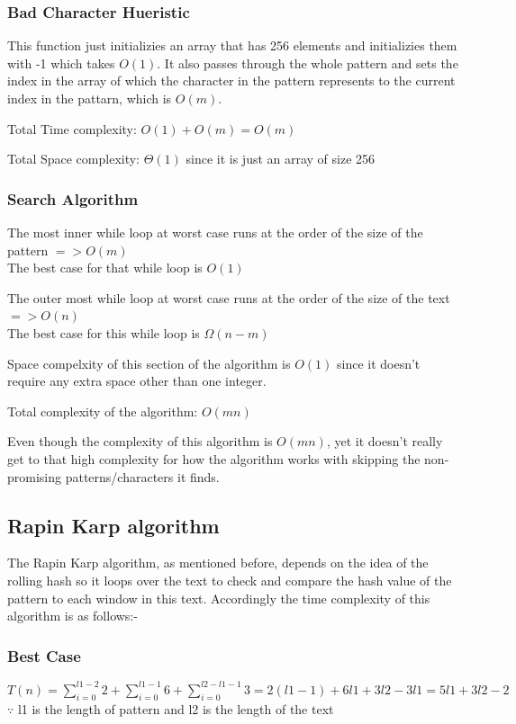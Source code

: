 \documentclass{article}
\theoremstyle{plain}
\begin{document}
\subsubsection*{Bad Character Hueristic}

This function just initializies an array that has 256 elements and initializies them with -1 which takes $O(1)$.
It also passes through the whole pattern and sets the index in the array of which the character in the pattern represents to the current index in the pattarn, which is $O(m)$.

\noindent Total Time complexity: $O(1) + O(m) = O(m)$

\noindent Total Space complexity: $\Theta(1)$ since it is just an array of size 256

\subsubsection*{Search Algorithm}

The most inner while loop at worst case runs at the order of the size of the pattern $=> O(m)$\\
The best case for that while loop is $O(1)$

The outer most while loop at worst case runs at the order of the size of the text $=>O(n)$\\
The best case for this while loop is $\Omega(n - m)$

Space compelxity of this section of the algorithm is $O(1)$ since it doesn't require any extra space other than one integer.

Total complexity of the algorithm: $O(mn)$


Even though the complexity of this algorithm is $O(mn)$, yet it doesn't really get to that high complexity for how the algorithm works with skipping the non-promising patterns/characters it finds.

\newpage
\subsection*{Rapin Karp algorithm}
The Rapin Karp algorithm, as mentioned before, depends on the idea of the rolling hash so it loops over the text to check and compare the hash value of the pattern to each window in this text. Accordingly the time complexity of this algorithm is as follows:-
\subsubsection*{Best Case}
$T(n)= \sum_{i=0}^{l1-2} 2 + \sum_{i=0}^{l1-1} 6 + \sum_{i=0}^{l2-l1-1} 3 = 2(l1-1)+6l1+3l2-3l1=5l1+3l2-2$
$\because$ l1 is the length of pattern and l2 is the length of the text
\end{document}
